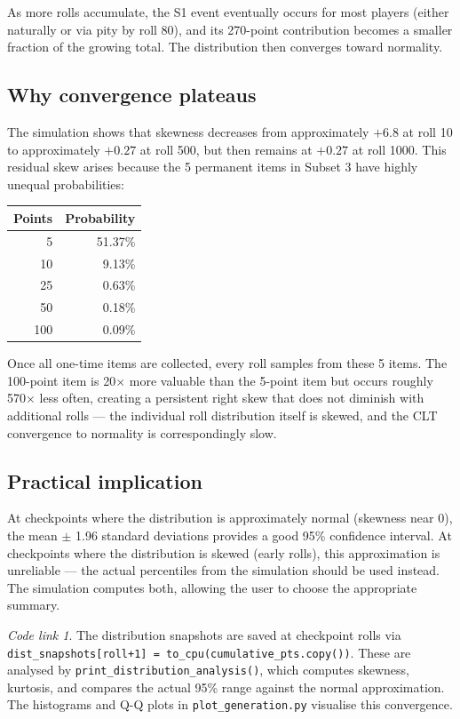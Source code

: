 \documentclass[11pt,a4paper]{article}
\theoremstyle{remark}
\newtheorem*{codelink}{Code link}
\begin{document}
As more rolls accumulate, the S1 event eventually occurs for most players (either naturally or via pity by roll 80), and its 270-point contribution becomes a smaller fraction of the growing total. The distribution then converges toward normality.

\subsection{Why convergence plateaus}

The simulation shows that skewness decreases from approximately $+6.8$ at roll 10 to approximately $+0.27$ at roll 500, but then remains at $+0.27$ at roll 1000. This residual skew arises because the 5 permanent items in Subset 3 have highly unequal probabilities:

\begin{center}
\begin{tabular}{@{}rr@{}}
\toprule
Points & Probability \\
\midrule
5   & 51.37\% \\
10  & 9.13\% \\
25  & 0.63\% \\
50  & 0.18\% \\
100 & 0.09\% \\
\bottomrule
\end{tabular}
\end{center}

Once all one-time items are collected, every roll samples from these 5 items. The 100-point item is 20$\times$ more valuable than the 5-point item but occurs roughly 570$\times$ less often, creating a persistent right skew that does not diminish with additional rolls --- the individual roll distribution itself is skewed, and the CLT convergence to normality is correspondingly slow.

\subsection{Practical implication}

At checkpoints where the distribution is approximately normal (skewness near 0), the mean $\pm$ 1.96 standard deviations provides a good 95\% confidence interval. At checkpoints where the distribution is skewed (early rolls), this approximation is unreliable --- the actual percentiles from the simulation should be used instead. The simulation computes both, allowing the user to choose the appropriate summary.

\begin{codelink}
The distribution snapshots are saved at checkpoint rolls via \texttt{dist\_snapshots[roll+1] = to\_cpu(cumulative\_pts.copy())}. These are analysed by \texttt{print\_distribution\_analysis()}, which computes skewness, kurtosis, and compares the actual 95\% range against the normal approximation. The histograms and Q-Q plots in \texttt{plot\_generation.py} visualise this convergence.
\end{codelink}
\end{document}

